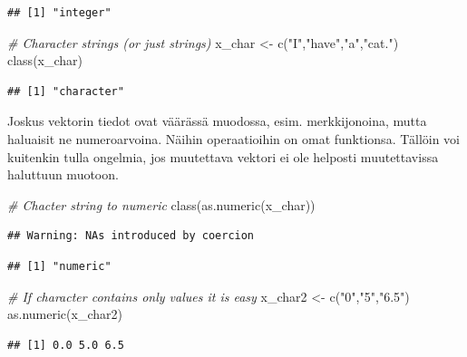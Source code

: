 \documentclass[
]{book}
\newenvironment{Shaded}{\begin{snugshade}}{\end{snugshade}}
\newcommand{\CommentTok}[1]{\textcolor[rgb]{0.56,0.35,0.01}{\textit{#1}}}
\newcommand{\FunctionTok}[1]{\textcolor[rgb]{0.00,0.00,0.00}{#1}}
\newcommand{\NormalTok}[1]{#1}
\newcommand{\OtherTok}[1]{\textcolor[rgb]{0.56,0.35,0.01}{#1}}
\newcommand{\StringTok}[1]{\textcolor[rgb]{0.31,0.60,0.02}{#1}}
\begin{document}
\begin{verbatim}
## [1] "integer"
\end{verbatim}

\begin{Shaded}
\begin{Highlighting}[]
\CommentTok{\# Character strings (or just strings)}
\NormalTok{x\_char }\OtherTok{\textless{}{-}} \FunctionTok{c}\NormalTok{(}\StringTok{"I"}\NormalTok{,}\StringTok{"have"}\NormalTok{,}\StringTok{"a"}\NormalTok{,}\StringTok{"cat."}\NormalTok{)}
\FunctionTok{class}\NormalTok{(x\_char)}
\end{Highlighting}
\end{Shaded}

\begin{verbatim}
## [1] "character"
\end{verbatim}

Joskus vektorin tiedot ovat väärässä muodossa, esim. merkkijonoina, mutta haluaisit ne numeroarvoina. Näihin operaatioihin on omat funktionsa. Tällöin voi kuitenkin tulla ongelmia, jos muutettava vektori ei ole helposti muutettavissa haluttuun muotoon.

\begin{Shaded}
\begin{Highlighting}[]
\CommentTok{\# Chacter string to numeric}
\FunctionTok{class}\NormalTok{(}\FunctionTok{as.numeric}\NormalTok{(x\_char))}
\end{Highlighting}
\end{Shaded}

\begin{verbatim}
## Warning: NAs introduced by coercion
\end{verbatim}

\begin{verbatim}
## [1] "numeric"
\end{verbatim}

\begin{Shaded}
\begin{Highlighting}[]
\CommentTok{\# If character contains only values it is easy}
\NormalTok{x\_char2 }\OtherTok{\textless{}{-}} \FunctionTok{c}\NormalTok{(}\StringTok{"0"}\NormalTok{,}\StringTok{"5"}\NormalTok{,}\StringTok{"6.5"}\NormalTok{)}
\FunctionTok{as.numeric}\NormalTok{(x\_char2)}
\end{Highlighting}
\end{Shaded}

\begin{verbatim}
## [1] 0.0 5.0 6.5
\end{verbatim}
\end{document}
